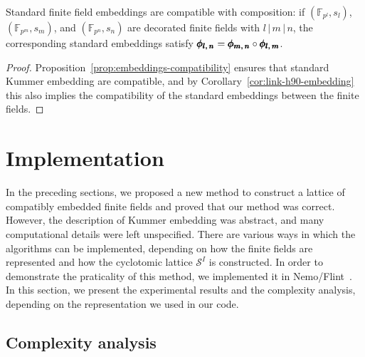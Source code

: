 \begin{prop}
\label{prop:ff-embeddings-compatibility}
Standard finite field embeddings are compatible with composition:
if $(\mathbb{F}_{p^l},s_l)$, $(\mathbb{F}_{p^m},s_m)$, and
$(\mathbb{F}_{p^n},s_n)$ are decorated finite fields
with $l\,|\,m\,|\,n$, the corresponding standard embeddings
satisfy $\pmb{\phi_{{l},\,{n}}}=\pmb{\phi_{{m},\,{n}}}\circ\pmb{\phi_{{l},\,{m}}}$.
\end{prop}
\begin{proof}
Proposition~\ref{prop:embeddings-compatibility} ensures that standard Kummer
embedding are compatible, and by Corollary~\ref{cor:link-h90-embedding} this
also implies the compatibility of the standard embeddings between the finite
fields.
\end{proof}

\section{Implementation}

In the preceding sections, we proposed a new method to construct a lattice of
compatibly embedded finite fields and proved that our method was correct.
However, the description of Kummer embedding was abstract, and many
computational details were left unspecified. There are various ways in which the
algorithms can be implemented, depending on how the finite fields are
represented and how the cyclotomic lattice $\mathcal S^I$ is constructed. In
order to demonstrate the praticality of this method, we implemented it in
Nemo/Flint~\cite{Nemo, Flint}. In this section, we present the experimental
results and the complexity analysis, depending on the representation we used in
our code.

\subsection{Complexity analysis}

